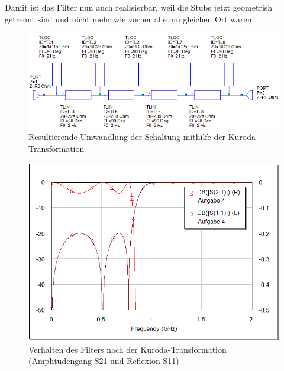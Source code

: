 Damit ist das Filter nun auch realisierbar, weil die  Stubs  jetzt  geometrish
getrennt  sind  und  nicht  mehr  wie  vorher  alle  am  gleichen  Ort  waren.

\begin{figure}[h!]
    \centering
    \includegraphics[width=\imagewidth]{images/stripline-kuroda}
    \caption{Resultierende Umwandlung der Schaltung mithilfe der Kuroda-Transformation}
    \label{fig:stripline-kuroda}
\end{figure}

\begin{figure}[h!]
    \centering
    \includegraphics[width=\imagewidth]{images/graph-kuroda}
    \caption{Verhalten des Filters nach der Kuroda-Transformation (Amplitudengang S21 und Reflexion S11)}
    \label{fig:graph-kuroda}
\end{figure}

